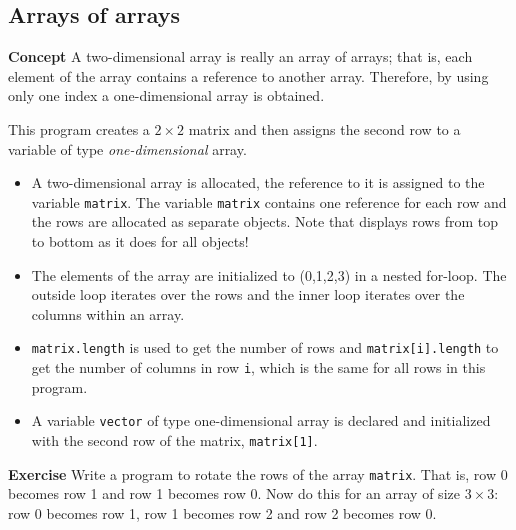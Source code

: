 \subsection{Arrays of arrays}\label{array.07}

\textbf{Concept} A two-dimensional array is really an array of arrays; that is, each 
element of the array contains a reference to another array. Therefore, by
using only one index a one-dimensional array is obtained.


This program creates a $2 \times 2$ matrix and then assigns the second row to a variable of type \emph{one-dimensional} array.
\begin{itemize}
  \item A two-dimensional array is allocated, the reference to it is assigned to the variable \texttt{matrix}.
  The variable \texttt{matrix} contains one reference for each row and the rows are allocated as separate objects. Note that \jel{} displays rows from top to bottom as it does for all objects!
  \item The elements of the array are initialized to (0,1,2,3) in a nested for-loop.
  The outside loop iterates over the rows and the inner loop iterates over the
  columns within an array.
  \item \texttt{matrix.length} is used to get the number of rows and 
  \texttt{matrix[i].length} to get the number of columns in row \texttt{i}, which 
  is the same for all rows in this program.
  \item A variable \texttt{vector} of type one-dimensional array is declared and initialized
  with the second row of the matrix, \texttt{matrix[1]}.
  \end{itemize}

\textbf{Exercise} Write a program to rotate the rows of the array \texttt{matrix}. That is, row 0 becomes row 1 and row 1 becomes row 0. Now do this for an array of size $3 \times 3$: row 0 becomes row 1, row 1 becomes row 2 and row 2 becomes row 0.

